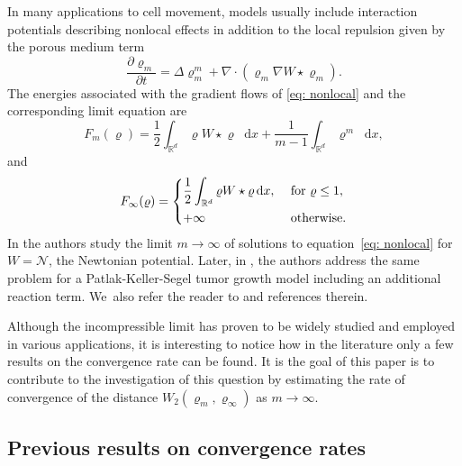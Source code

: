 \documentclass[11pt]{article}
\numberwithin{equation}{section}
\newcommand{\curlyN}{\mathcal{N}}
\newcommand{\partialt}[1]{\dfrac{\partial#1}{\partial t}}
\newcommand{\dx}[1]{\mathop{}\!\mathrm{d} #1}
\newcommand{\R}{\mathbb{R}}
\theoremstyle{plain}
\theoremstyle{remark}
\begin{document}
In many applications to cell movement, models usually include interaction potentials describing nonlocal effects in addition to the local repulsion given by the porous medium term
\begin{equation}\label{eq: nonlocal}
\partialt{\varrho_m} = \Delta \varrho_m^m +\nabla\cdot(\varrho_m \nabla W\star \varrho_m).
\end{equation}
The energies associated with the gradient flows of \eqref{eq: nonlocal} and the corresponding limit equation are
\begin{equation*}
F_m(\varrho) = \frac 12 \int_{\R^d} \varrho W\star \varrho \dx x + \frac{1}{m-1}\int_{\R^d} \varrho^m \dx x,
\end{equation*}
and
\begin{equation*}
F_\infty(\varrho) =
\begin{dcases}
\frac 12 \int_{\R^d} \varrho W\star \varrho \dx x, &\text{ for } \varrho\leq 1,\\
+\infty &\text{ otherwise}.
\end{dcases}
\end{equation*}
In \cite{CKY18} the authors study the limit $m\to\infty$ of solutions to equation~\eqref{eq: nonlocal} for \hbox{$W=\curlyN$}, the Newtonian potential. Later, in \cite{perthamePKS}, the authors address the same problem for a Patlak-Keller-Segel tumor growth model including an additional reaction term. We~also refer the reader to \cite{CT2020, CG2021, CCY2019} and references therein.

Although the incompressible limit has proven to be widely studied and employed in various applications, it is interesting to notice how in the literature only a few results on the convergence rate can be found.
It is the goal of this paper is to contribute to the investigation of this question by estimating the rate of convergence of the distance $W_2(\varrho_m, \varrho_\infty)$ as $m \to \infty$.

\subsection{Previous results on convergence rates}
\end{document}

